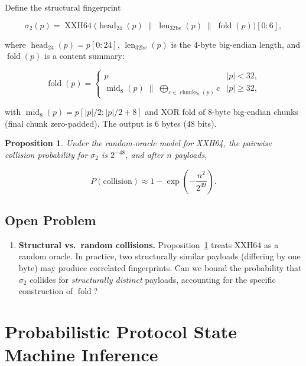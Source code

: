 \documentclass[11pt,a4paper]{article}
\newtheorem{proposition}{Proposition}
\begin{document}
Define the structural fingerprint

\[
\sigma_2(p) = \operatorname{XXH64}\bigl(
    \operatorname{head}_{24}(p) \;\|\;
    \operatorname{len}_{32\text{be}}(p) \;\|\;
    \operatorname{fold}(p)
\bigr)[0:6],
\]

where $\operatorname{head}_{24}(p) = p[0:24]$,
$\operatorname{len}_{32\text{be}}(p)$ is the 4-byte big-endian length,
and $\operatorname{fold}(p)$ is a content summary:

\[
\operatorname{fold}(p) =
\begin{cases}
p & |p| < 32, \\[4pt]
\operatorname{mid}_8(p) \;\|\;
    \displaystyle\bigoplus_{c \in \operatorname{chunks}_8(p)} c
    & |p| \ge 32,
\end{cases}
\]

with $\operatorname{mid}_8(p) = p[|p|/2 : |p|/2+8]$ and XOR fold of
8-byte big-endian chunks (final chunk zero-padded).  The output is
$6$ bytes ($48$ bits).

\begin{proposition}
\label{prop:structural-collision}
Under the random-oracle model for XXH64, the pairwise collision
probability for $\sigma_2$ is $2^{-48}$, and after $n$ payloads,

\[
P(\text{collision}) \approx 1 - \exp\!\left(-\frac{n^2}{2^{49}}\right).
\]
\end{proposition}

\subsection{Open Problem}

\begin{enumerate}
  \item \textbf{Structural vs.\ random collisions.}
        Proposition~\ref{prop:structural-collision} treats XXH64 as a
        random oracle.  In practice, two structurally similar payloads
        (differing by one byte) may produce correlated fingerprints.
        Can we bound the probability that $\sigma_2$ collides for
        \emph{structurally distinct} payloads, accounting for the
        specific construction of $\operatorname{fold}$?
\end{enumerate}

\section{Probabilistic Protocol State Machine Inference}
\end{document}
